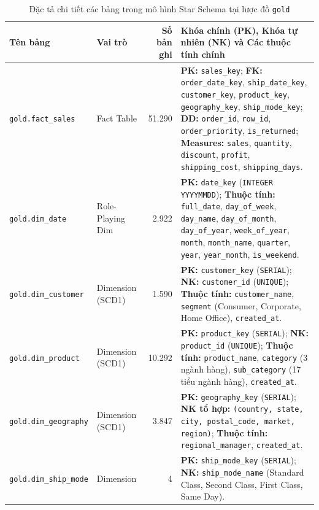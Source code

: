 \begin{table}[H]
\centering
\caption{Đặc tả chi tiết các bảng trong mô hình Star Schema tại lược đồ \texttt{gold}}
\label{tab:star_schema_tables}
\footnotesize
\renewcommand{\arraystretch}{1.22}
\begin{tabularx}{\textwidth}{|l|l|r|X|}
\hline
\textbf{Tên bảng} & \textbf{Vai trò} & \textbf{Số bản ghi} & \textbf{Khóa chính (PK), Khóa tự nhiên (NK) và Các thuộc tính chính} \\
\hline
\texttt{gold.fact\_sales} & Fact Table & 51.290 & \textbf{PK:} \texttt{sales\_key}; \textbf{FK:} \texttt{order\_date\_key}, \texttt{ship\_date\_key}, \texttt{customer\_key}, \texttt{product\_key}, \texttt{geography\_key}, \texttt{ship\_mode\_key}; \textbf{DD:} \texttt{order\_id}, \texttt{row\_id}, \texttt{order\_priority}, \texttt{is\_returned}; \textbf{Measures:} \texttt{sales}, \texttt{quantity}, \texttt{discount}, \texttt{profit}, \texttt{shipping\_cost}, \texttt{shipping\_days}. \\
\hline
\texttt{gold.dim\_date} & Role-Playing Dim & 2.922 & \textbf{PK:} \texttt{date\_key} (\texttt{INTEGER YYYYMMDD}); \textbf{Thuộc tính:} \texttt{full\_date}, \texttt{day\_of\_week}, \texttt{day\_name}, \texttt{day\_of\_month}, \texttt{day\_of\_year}, \texttt{week\_of\_year}, \texttt{month}, \texttt{month\_name}, \texttt{quarter}, \texttt{year}, \texttt{year\_month}, \texttt{is\_weekend}. \\
\hline
\texttt{gold.dim\_customer} & Dimension (SCD1) & 1.590 & \textbf{PK:} \texttt{customer\_key} (\texttt{SERIAL}); \textbf{NK:} \texttt{customer\_id} (\texttt{UNIQUE}); \textbf{Thuộc tính:} \texttt{customer\_name}, \texttt{segment} (Consumer, Corporate, Home Office), \texttt{created\_at}. \\
\hline
\texttt{gold.dim\_product} & Dimension (SCD1) & 10.292 & \textbf{PK:} \texttt{product\_key} (\texttt{SERIAL}); \textbf{NK:} \texttt{product\_id} (\texttt{UNIQUE}); \textbf{Thuộc tính:} \texttt{product\_name}, \texttt{category} (3 ngành hàng), \texttt{sub\_category} (17 tiểu ngành hàng), \texttt{created\_at}. \\
\hline
\texttt{gold.dim\_geography} & Dimension (SCD1) & 3.847 & \textbf{PK:} \texttt{geography\_key} (\texttt{SERIAL}); \textbf{NK tổ hợp:} \texttt{(country, state, city, postal\_code, market, region)}; \textbf{Thuộc tính:} \texttt{regional\_manager}, \texttt{created\_at}. \\
\hline
\texttt{gold.dim\_ship\_mode} & Dimension & 4 & \textbf{PK:} \texttt{ship\_mode\_key} (\texttt{SERIAL}); \textbf{NK:} \texttt{ship\_mode\_name} (Standard Class, Second Class, First Class, Same Day). \\
\hline
\end{tabularx}
\end{table}

